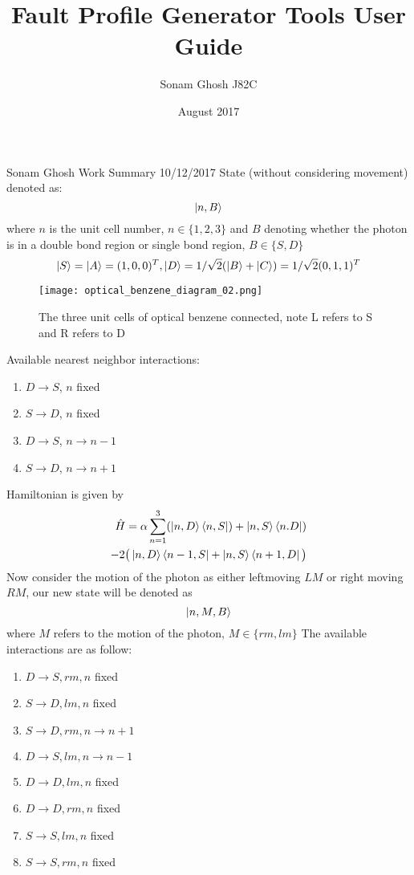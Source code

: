\documentclass{article}
\title{Fault Profile Generator Tools User Guide}
\author{Sonam Ghosh J82C}
\date{August 2017}
\begin{document}
Sonam Ghosh Work Summary 10/12/2017 \newline
\newline
State (without considering movement) denoted as:
$$ \ket{n, B}$$
where $n$ is the unit cell number, $n \in \{1,2,3\}$ and $B$ denoting whether the photon is in a double bond region or single bond region, $B \in \{S, D\}$ \newline
$$ \ket{S} = \ket{A} = (1,0,0)^{T} , \ket{D} = 1/\sqrt{2} (\ket{B} + \ket{C}) = 1/\sqrt{2} (0,1,1)^{T}$$ 
\begin{figure}[h]
    \centering
    \texttt{[image: optical\_benzene\_diagram\_02.png]}
    \caption{The three unit cells of optical benzene connected, note L refers to S and R refers to D}
    \label{fig:my_label}
\end{figure}
Available nearest neighbor interactions:
\begin{enumerate}
    \item $D \rightarrow S$, $n$ fixed
    \item $S \rightarrow D$, $n$ fixed
    \item $D \rightarrow S$, $n \rightarrow n-1$
    \item $S \rightarrow D$, $n \rightarrow n+1$
\end{enumerate}
Hamiltonian is given by \newline
\begin{equation}
    \begin{split}
        \hat{H} = \alpha \sum_{n=1}^{3} (\ket{n,D}\bra{n, S}) + \ket{n, S}\bra{n. D}) \\
        - 2 \big( \ket{n, D}\bra{n-1, S} + \ket{n, S}\bra{n+1, D} \big)
    \end{split}
\end{equation}
\newpage
Now consider the motion of the photon as either leftmoving $LM$ or right moving $RM$, our new state will be denoted as 
$$ \ket{n, M, B} $$
where $M$ refers to the motion of the photon, $M \in \{rm, lm\}$
The available interactions are as follow:
\begin{enumerate}
    \item $D \rightarrow S, rm, n$ fixed
    \item $S \rightarrow D, lm, n$ fixed
    \item $S \rightarrow D, rm, n \rightarrow n+1$
    \item $D \rightarrow S, lm, n \rightarrow n-1$
    \item $D \rightarrow D, lm, n$ fixed
    \item $D \rightarrow D, rm, n$ fixed
    \item $S \rightarrow S, lm, n$ fixed
    \item $S \rightarrow S, rm, n$ fixed
\end{enumerate}
\end{document}

